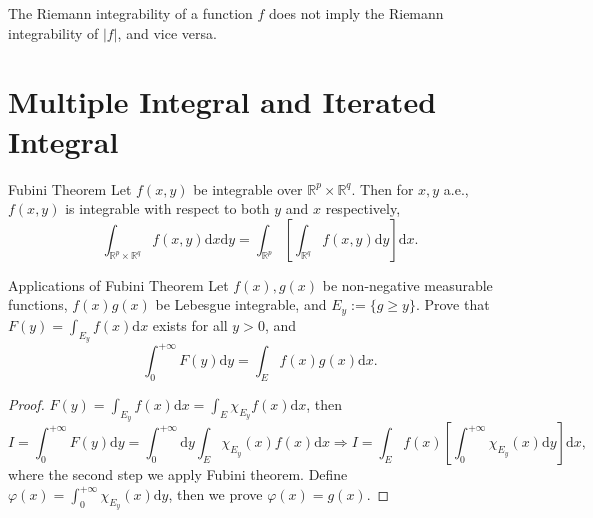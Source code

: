 \begin{note}
  The Riemann integrability of a function $f$ does not imply the Riemann integrability of $|f|$,
  and vice versa.
\end{note}

\section{Multiple Integral and Iterated Integral}

\begin{theorem}{Fubini Theorem}{}
  Let $f(x, y)$ be integrable over $\mathbb{R}^p \times \mathbb{R}^q$. Then
  for $x, y$ a.e., $f(x,y)$ is integrable with respect to both $y$ and $x$
  respectively,
  \begin{equation}
    \int_{\mathbb{R}^p \times \mathbb{R}^q} f(x,y)\mathrm{d} x\mathrm{d}y 
    = \int_{\mathbb{R}^p} \left[ \int_{\mathbb{R}^q} f(x,y)\mathrm{d} y \right]\mathrm{d} x.
  \end{equation}
\end{theorem}

\begin{example}{Applications of Fubini Theorem}{}
  Let $f(x), g(x)$ be non-negative measurable functions, $f(x)g(x)$ be Lebesgue integrable,
  and $E_y := \{g \geq y\}$.
  Prove that $F(y) = \int_{E_y} f(x)\mathrm{d} x$ exists for all $y > 0$, and
  \begin{equation}
    \int_0^{+\infty} F(y) \mathrm{d} y = \int_E f(x) g(x) \mathrm{d} x.
  \end{equation}
\end{example}

\begin{proof}
  $F(y) = \int_{E_y}f(x)\mathrm{d} x = \int_E \chi_{E_y}f(x)\mathrm{d} x$, then
  \begin{equation}
    I = \int_0^{+\infty} F(y) \mathrm{d} y = \int_0^{+\infty} \mathrm{d} y \int_E \chi_{E_y}(x) f(x)\mathrm{d} x
    \Rightarrow
    I = \int_E f(x) \left[ \int_0^{+\infty} \chi_{E_y}(x) \mathrm{d} y \right]\mathrm{d} x,
  \end{equation}
  where the second step we apply Fubini theorem.
  Define $\varphi(x) = \int_0^{+\infty} \chi_{E_y}(x)\mathrm{d} y$,
  then we prove $\varphi(x) = g(x)$.
\end{proof}



